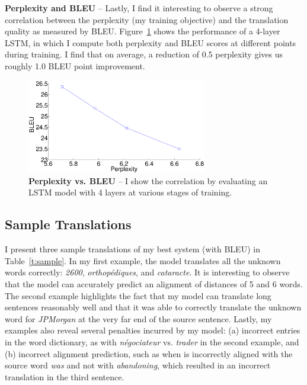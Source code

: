 {\bf Perplexity and BLEU} -- Lastly, I find it interesting to observe a strong correlation 
between the perplexity (my training objective) and the translation quality as measured by BLEU. 
Figure~\ref{f:cor} shows the performance of a 4-layer LSTM, in which I compute both perplexity and 
BLEU scores at different points during training. I find that on average, a reduction of 0.5 perplexity 
gives us roughly 1.0 BLEU point improvement.
\begin{figure}[tbh!]
\centering
\includegraphics[width=0.7\textwidth, clip=true, trim= 0 0 0 0]{img/3-cor}
\caption[Perplexity vs. BLEU]{{\bf Perplexity vs. BLEU} -- I show the correlation by evaluating an LSTM model with 4 layers at various stages of training. 
} 
\label{f:cor}
\end{figure}


\subsection{Sample Translations}
I present three sample translations of my best system
(with \bestbleuunk{} BLEU) in Table~\ref{t:sample}. In my  first example,
the model translates all the
unknown words correctly: {\it 2600}, {\it orthop{\'e}diques}, and {\it
cataracte}. It is interesting to observe that the model can accurately predict
an alignment of distances of 5 and 6 words. The second
example highlights the fact that my model can translate long
sentences reasonably well and that it was able to
correctly translate the unknown word for {\it JPMorgan} at the very far end of
the source sentence. Lastly, my examples also reveal several
penalties incurred by my model: (a) incorrect entries in the word dictionary, as with {\it n\'{e}gociateur} vs. {\it trader} in the second example, 
and (b) incorrect alignment prediction, such as when 
  is incorrectly aligned
with the source word {\it was} and not with {\it abandoning}, which resulted in an
incorrect translation in the third sentence.

